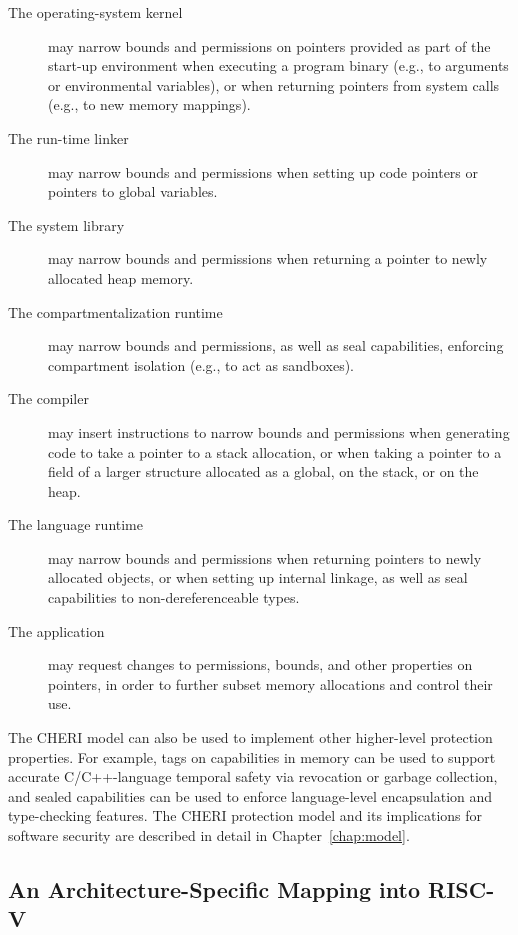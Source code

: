 \begin{description}
\item[The operating-system kernel] may narrow bounds and permissions on
  pointers provided as part of the start-up environment when executing a
  program binary (e.g., to arguments or environmental variables), or when
  returning pointers from system calls (e.g., to new memory mappings).

\item[The run-time linker] may narrow bounds and permissions when setting up
  code pointers or pointers to global variables.

\item[The system library] may narrow bounds and permissions when returning a
  pointer to newly allocated heap memory.

\item[The compartmentalization runtime] may narrow bounds and permissions,
  as well as seal capabilities, enforcing compartment isolation (e.g., to act
  as sandboxes).

\item[The compiler] may insert instructions to narrow bounds and permissions
  when generating code to take a pointer to a stack allocation, or when taking
  a pointer to a field of a larger structure allocated as a global, on the
  stack, or on the heap.

\item[The language runtime] may narrow bounds and permissions when returning
  pointers to newly allocated objects, or when setting up internal linkage, as
  well as seal capabilities to non-dereferenceable types.

\item[The application] may request changes to permissions, bounds, and other
  properties on pointers, in order to further subset memory allocations and
  control their use.
\end{description}

The CHERI model can also be used to implement other higher-level protection
properties.
For example, tags on capabilities in memory can be used to support accurate
C/C++-language temporal safety via revocation or garbage collection, and
sealed capabilities can be used to enforce language-level encapsulation and
type-checking features.
The CHERI protection model and its implications for software security are
described in detail in Chapter~\ref{chap:model}.

\subsection{An Architecture-Specific Mapping into RISC-V}
\label{sec:cheri-isa-design}

